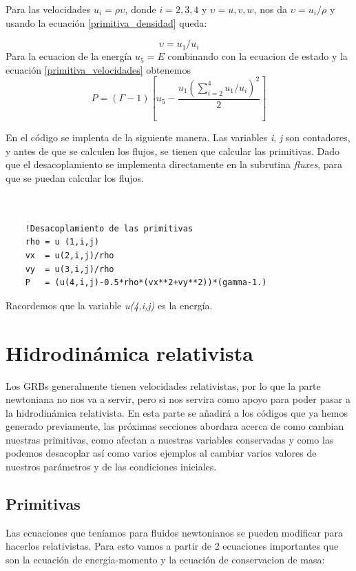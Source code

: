 \documentclass[12pt,a4paper]{book}
\begin{document}
Para las velocidades $u_i=\rho \upsilon$, donde $i=2,3,4$ y $\upsilon=u,v,w$, nos da $\upsilon= u_i/ \rho$ y usando la ecuación \ref{primitiva_densidad} queda:

\begin{equation} \label{primitiva_velocidades}
\upsilon = u_1/u_i
\end{equation}
Para la ecuacion de la energía $u_5=E$ combinando con la ecuacion de estado y la ecuación \ref{primitiva_velocidades} obtenemos
\begin{equation}
P = \left( \Gamma - 1 \right) \left[ u_5 - \frac{u_1 \left( \sum_{i=2}^{4} u_1/u_i \right)^2}{2} \right]
\end{equation}

En el código se implenta de la siguiente manera.
Las variables \emph{i}, \emph{j} son contadores, y antes de que se calculen los flujos, se tienen que calcular las primitivas. Dado que el desacoplamiento
se implementa directamente en la subrutina \emph{fluxes}, para que se puedan calcular los flujos.

\begin{lstlisting}[frame=single] 
  

    !Desacoplamiento de las primitivas
    rho = u (1,i,j)
    vx  = u(2,i,j)/rho
    vy  = u(3,i,j)/rho
    P   = (u(4,i,j)-0.5*rho*(vx**2+vy**2))*(gamma-1.)

\end{lstlisting}

Racordemos que la variable \emph{u(4,i,j)} es la energía.
  


\section{Hidrodinámica relativista}
Los GRBs generalmente tienen velocidades relativistas, por lo que la parte newtoniana no nos va a servir, pero si nos servira como apoyo para poder pasar
a la hidrodinámica relativista.
En esta parte se añadirá a los códigos que ya hemos generado previamente, las próximas secciones abordara acerca de como cambian nuestras primitivas,
como afectan a nuestras variables conservadas y como las podemos desacoplar así como varios ejemplos al cambiar varios valores de nuestros parámetros y 
de las condiciones iniciales.


\subsection{Primitivas}
Las ecuaciones que teníamos para fluidos newtonianos se pueden modificar para hacerlos relativistas. Para esto vamos a partir de 2 ecuaciones importantes que son la ecuación de energía-momento y la ecuación de conservacion de masa:
\end{document}

